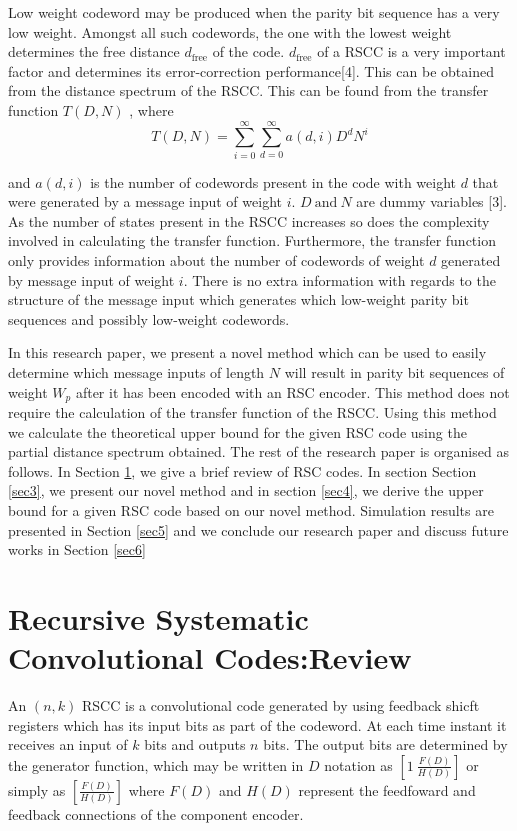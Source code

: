 \documentclass[conference]{IEEEtran}
\begin{document}
Low weight codeword may be produced when the parity bit sequence has a very low weight. Amongst all such codewords, the one with the lowest weight determines the free distance $d_{\text{free}}$ of the code. 
$d_{\text{free}}$  of a RSCC is a very important factor and determines its error-correction performance[4].  This can be obtained from the distance spectrum of the RSCC. This can be found from the transfer function $T(D,N)$ , where 
$$
T(D,N)=\sum_{i=0}^{\infty}\sum_{d=0}^{\infty} a(d,i)D^dN^i
$$

and $a(d,i)$ is the number of codewords present in the code with weight $d$ that were generated by a message input of weight $i$. $D ~\text{and} ~ N$ are dummy variables [3]. As the number of states present in the RSCC increases so does the complexity involved in calculating the transfer function. Furthermore, the transfer function only provides information about the number of codewords of weight $d$ generated by message input of weight $i$. There is no extra information with regards to the structure of the message input which generates which low-weight parity bit sequences and possibly low-weight codewords.

In this research paper, we present a novel method which can be used to easily determine which message inputs of length $N$ will result in parity bit sequences of weight $W_p$ after it has been encoded with an RSC encoder. This method does not require the calculation of the transfer function of the RSCC. Using this method we calculate the theoretical upper bound for the given RSC code using the partial distance spectrum obtained. The rest of the research paper is organised as follows. In Section \ref{sec2}, we give a brief review of RSC codes. In section Section \ref{sec3}, we present our novel method and in section \ref{sec4}, we derive the upper bound for a given RSC code based on our novel method. Simulation results are presented in Section \ref{sec5} and we conclude our research paper and discuss future works in Section \ref{sec6}

\section{Recursive Systematic Convolutional Codes:Review}
\label{sec2}

An  $(n,k)$ RSCC is a convolutional code generated by using feedback shicft registers which has its input bits as part of the codeword. At each time instant it receives an input of $k$ bits and outputs $n$ bits. The output bits are determined by the generator function, which may be written in $D$ notation as  $[1 ~\frac{F(D)}{H(D)}]$ or simply as $[\frac{F(D)}{H(D)}]$ where $F(D)$ and $H(D)$ represent the feedfoward and feedback connections of the component encoder.
\end{document}
